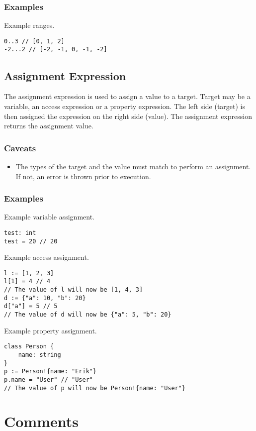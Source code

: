 \subsubsection{Examples}

Example ranges.
\begin{verbatim}
0..3 // [0, 1, 2]
-2...2 // [-2, -1, 0, -1, -2]
\end{verbatim}

\subsection{Assignment Expression}

The assignment expression is used to assign a value to a target. Target may be a variable, an access expression or a property expression.
The left side (target) is then assigned the expression on the right side (value). The assignment expression returns the assignment value.

\subsubsection{Caveats}

\begin{itemize}
    \item The types of the target and the value must match to perform an assignment. If not, an error is thrown prior to execution.
\end{itemize}

\subsubsection{Examples}

Example variable assignment.
\begin{verbatim}
test: int
test = 20 // 20
\end{verbatim}
Example access assignment.
\begin{verbatim}
l := [1, 2, 3]
l[1] = 4 // 4
// The value of l will now be [1, 4, 3]
d := {"a": 10, "b": 20}
d["a"] = 5 // 5
// The value of d will now be {"a": 5, "b": 20}
\end{verbatim}
\clearpage
Example property assignment.
\begin{verbatim}
class Person {
    name: string
}
p := Person!{name: "Erik"}
p.name = "User" // "User"
// The value of p will now be Person!{name: "User"}
\end{verbatim}

\section{Comments}

